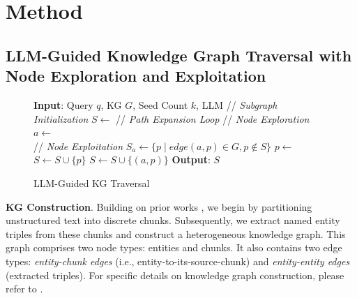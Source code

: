 \section{Method}
\label{sec:method}



\subsection{LLM-Guided Knowledge Graph Traversal with Node Exploration and Exploitation}
\label{sec::llm-guided-traversal}




\begin{figure}
\begin{minipage}{\linewidth} 
    \begin{algorithm}[H]
    
    \caption{LLM-Guided KG Traversal}
    \begin{algorithmic}[1]
    \STATE \textbf{Input}: Query $q$, KG $G$, Seed Count $k$, LLM
    \STATE // \textit{Subgraph Initialization}
    \STATE $S \gets$ 
    \vspace{1mm}
    \STATE // \textit{Path Expansion Loop}
    \REPEAT
    \STATE // \textit{Node Exploration}
    \STATE $a \gets$  \\ 
    \STATE // \textit{Node Exploitation}
    \STATE $S_a \gets \{p \mid edge (a,p) \in G, p \notin S\}$
    \STATE $p \gets$  \\  
    \STATE $S \gets S \cup \{p\}$
    \STATE $S \gets S \cup \{(a,p)\}$
    \STATE \textbf{Output}: $S$
    \end{algorithmic}
    \label{ag:llm-guided-traversal}
    \end{algorithm}
\end{minipage}
\end{figure}
\textbf{KG Construction}. Building on prior works \cite{Main2,Main6}, we begin by partitioning unstructured text into discrete chunks. Subsequently, we extract named entity triples from these chunks and construct a heterogeneous knowledge graph. This graph comprises two node types: entities and chunks. It also contains two edge types: \textit{entity-chunk edges} (i.e., entity-to-its-source-chunk) and \textit{entity-entity edges} (extracted triples). For specific details on knowledge graph construction, please refer to .

